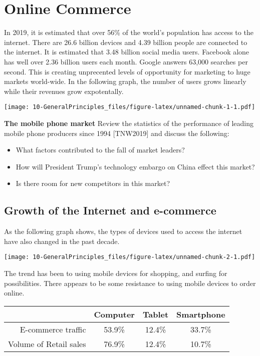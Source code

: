 \documentclass[]{book}
\providecommand{\tightlist}{%
  \setlength{\itemsep}{0pt}\setlength{\parskip}{0pt}}
\let\BeginKnitrBlock\begin \let\EndKnitrBlock\end
\begin{document}
\hypertarget{online-commerce}{%
\section{Online Commerce}\label{online-commerce}}

In 2019, it is estimated that over 56\% of the world's population has access to the internet. There are 26.6 billion devices and 4.39 billion people are connected to the internet. It is estimated that 3.48 billion social media users. Facebook alone has well over 2.36 billion users each month. Google answers 63,000 searches per second. This is creating unprecented levels of opportunity for marketing to huge markets world-wide. In the following graph, the number of users grows linearly while their revenues grow expotentally. \citep{Statista2019}

\texttt{[image: 10-GeneralPrinciples\_files/figure-latex/unnamed-chunk-1-1.pdf]}

\BeginKnitrBlock{rmddiscussion}
\textbf{The mobile phone market}
Review the statistics of the performance of leading mobile phone producers since 1994 {[}TNW2019{]} and discuss the following:

\begin{itemize}
\tightlist
\item
  What factors contributed to the fall of market leaders?
\item
  How will President Trump's technology embargo on China effect this market?
\item
  Is there room for new competitors in this market?
\end{itemize}
\EndKnitrBlock{rmddiscussion}

\hypertarget{growth-of-the-internet-and-e-commerce}{%
\subsection{Growth of the Internet and e-commerce}\label{growth-of-the-internet-and-e-commerce}}

As the following graph shows, the types of devices used to access the internet have also changed in the past decade.

\texttt{[image: 10-GeneralPrinciples\_files/figure-latex/unnamed-chunk-2-1.pdf]}

The trend has been to using mobile devices for shopping, and surfing for possibilities. There appears to be some resistance to using mobile devices to order online.

\begin{longtable}[]{@{}rccc@{}}
\toprule
& Computer & Tablet & Smartphone\tabularnewline
\midrule
\endhead
E-commerce traffic & 53.9\% & 12.4\% & 33.7\%\tabularnewline
Volume of Retail sales & 76.9\% & 12.4\% & 10.7\%\tabularnewline
\bottomrule
\end{longtable}
\end{document}
